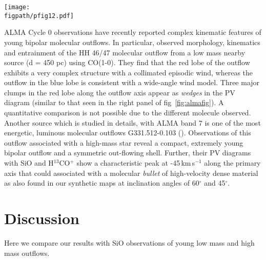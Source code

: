 \documentclass[useAMS,usenatbib]{mn2e}
\newcommand{\figpath}{../NEWFIGS}
\begin{document}
\begin{figure*}
 \texttt{[image: \\figpath/pfig12.pdf]}%
 \caption{{\bf Left:} The integrated intensity map of SiO(2-1), (5-4)
   and (8-7). The emission map shows the J=5-4 line intensity (in units
   of Jy$\,$kms$^{-1}$/beam), the blue contours show the J=8-7 line
   intensity and the green contours show the J=2-1 line intensity. The
   jet is inclined at an angle of 60$^{\circ}$. {\bf Right:} The PV
   diagram taken along the axis of the jet for the 5-4 line (in units
   of Jy/beam), showing the higher J transitions highlighting the
   knots of the jet and broad emission at the bow shock. 
   In both panels the ticks on the color bar represent the different contour levels.}
\label{fig:almafig}
\end{figure*} 

ALMA Cycle 0 observations have recently reported complex kinematic
features of young bipolar molecular outflows. In particular,
\cite{Arce:2013p14902} observed morphology, kinematics and entrainment 
of the HH 46/47 molecular outflow from a low mass nearby
source (d = 450 pc) using CO(1-0). They find that the red
lobe of the outflow exhibits a very complex structure with a
collimated episodic wind, whereas the outflow in the blue lobe is
consistent with a
wide-angle wind model. Three major clumps in the red lobe along the
outflow axis appear as {\em{wedges}} in the PV
diagram (similar to that seen in the right panel of fig~\ref{fig:almafig}). 
A quantitative comparison is not possible due to the different
molecule observed. Another source which is studied in details, with ALMA band 7 is
one of the most energetic, luminous molecular outflows
G331.512-0.103 (\citealt{Merello:2013p15066}). Observations of this outflow
associated with a high-mass star reveal a compact, extremely young
bipolar outflow and a symmetric out-flowing shell. Further, their PV
diagrams with SiO and H$^{13}$CO$^{+}$ show a characteristic peak at
-45\,km\,s$^{-1}$ along the primary axis that could associated with a 
molecular {\em bullet} of high-velocity dense material as also found in our
synthetic maps at inclination angles of 60$^{\circ}$ and 45$^{\circ}$.

 
\section{Discussion}
\label{sec:discussion}
Here we compare our results with SiO observations of young low
mass and high mass outflows.
\end{document}
